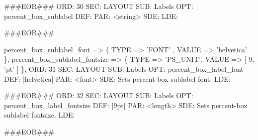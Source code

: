 \documentclass[11pt]{article}
\def\nwendcode{\endtrivlist \endgroup} %
\let\nwdocspar=\par                    %
\begin{document}
###EOR###
ORD: 30
SEC: LAYOUT
SUB: Labels
OPT: percent_box_sublabel
DEF: 
PAR: <string>
SDE: 
LDE:

###EOR###
\nwendcode{}\nwdocspar
\nwenddocs{}\plusendmoddef
percent_box_sublabel_font     => \{ TYPE => 'FONT'   , VALUE => 'helvetica'  \},
percent_box_sublabel_fontsize => \{ TYPE => 'PS_UNIT', VALUE => [ 9, 'pt' ]  \},
\eatline
{}\nwendcode{}\plusendmoddef
ORD: 31
SEC: LAYOUT
SUB: Labels
OPT: percent_box_label_font
DEF: |helvetica|
PAR: <font>
SDE: Sets percent-box sublabel font.
LDE:

###EOR###
ORD: 32
SEC: LAYOUT
SUB: Labels
OPT: percent_box_label_fontsize
DEF: |9pt|
PAR: <length>
SDE: Sets percent-box sublabel fontsize.
LDE:

###EOR###
\nwendcode{}\nwdocspar
\end{document}
